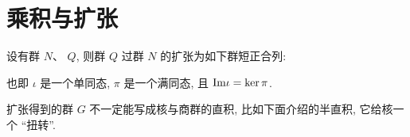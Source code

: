 \section{乘积与扩张}
    \begin{definition}[群的正合列]
        设有群 $N$、 $Q$, 则群 $Q$ 过群 $N$ 的扩张为如下群短正合列:
        \begin{center}
        \end{center}
        也即 $\iota$ 是一个单同态, $\pi$ 是一个满同态, 且 ${\rm Im}\iota=\ker\pi$.
    \end{definition}

    扩张得到的群 $G$ 不一定能写成核与商群的直积, 比如下面介绍的半直积, 它给核一个 “扭转”.


